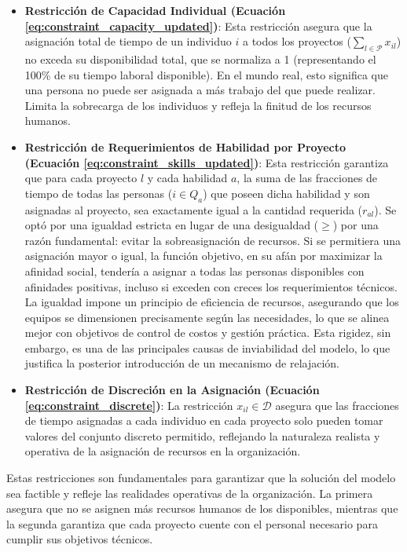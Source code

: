 \documentclass[conference]{IEEEtran}
\begin{document}
\begin{itemize}
    \item \textbf{Restricción de Capacidad Individual (Ecuación \ref{eq:constraint_capacity_updated})}: Esta restricción asegura que la asignación total de tiempo de un individuo \(i\) a todos los proyectos (\(\sum_{l \in \mathcal{P}} x_{il}\)) no exceda su disponibilidad total, que se normaliza a 1 (representando el 100\% de su tiempo laboral disponible). En el mundo real, esto significa que una persona no puede ser asignada a más trabajo del que puede realizar. Limita la sobrecarga de los individuos y refleja la finitud de los recursos humanos.

    \item \textbf{Restricción de Requerimientos de Habilidad por Proyecto (Ecuación \ref{eq:constraint_skills_updated})}: Esta restricción garantiza que para cada proyecto \(l\) y cada habilidad \(a\), la suma de las fracciones de tiempo de todas las personas (\(i \in Q_a\)) que poseen dicha habilidad y son asignadas al proyecto, sea exactamente igual a la cantidad requerida (\(r_{al}\)). Se optó por una igualdad estricta en lugar de una desigualdad (\(\geq\)) por una razón fundamental: evitar la sobreasignación de recursos. Si se permitiera una asignación mayor o igual, la función objetivo, en su afán por maximizar la afinidad social, tendería a asignar a todas las personas disponibles con afinidades positivas, incluso si exceden con creces los requerimientos técnicos. La igualdad impone un principio de eficiencia de recursos, asegurando que los equipos se dimensionen precisamente según las necesidades, lo que se alinea mejor con objetivos de control de costos y gestión práctica. Esta rigidez, sin embargo, es una de las principales causas de inviabilidad del modelo, lo que justifica la posterior introducción de un mecanismo de relajación.

    \item \textbf{Restricción de Discreción en la Asignación (Ecuación \ref{eq:constraint_discrete})}: La restricción \(x_{il} \in \mathcal{D}\) asegura que las fracciones de tiempo asignadas a cada individuo en cada proyecto solo pueden tomar valores del conjunto discreto permitido, reflejando la naturaleza realista y operativa de la asignación de recursos en la organización.

\end{itemize}

Estas restricciones son fundamentales para garantizar que la solución del modelo sea factible y refleje las realidades operativas de la organización. La primera asegura que no se asignen más recursos humanos de los disponibles, mientras que la segunda garantiza que cada proyecto cuente con el personal necesario para cumplir sus objetivos técnicos.
\end{document}

